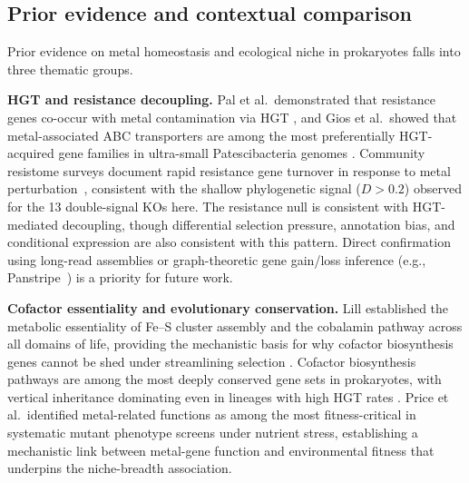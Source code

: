 \documentclass[times]{zHenriquesLab-StyleBioRxiv}
\begin{document}

\subsection{Prior evidence and contextual comparison}

Prior evidence on metal homeostasis and ecological niche in prokaryotes falls into three thematic groups.

\textbf{HGT and resistance decoupling.} Pal et al.\ demonstrated that resistance genes co-occur with metal contamination via HGT \cite{pal2015}, and Gios et al.\ showed that metal-associated ABC transporters are among the most preferentially HGT-acquired gene families in ultra-small Patescibacteria genomes \cite{gios2025}. Community resistome surveys document rapid resistance gene turnover in response to metal perturbation~\cite{hemme2016}, consistent with the shallow phylogenetic signal ($D > 0.2$) observed for the 13 double-signal KOs here. The resistance null is consistent with HGT-mediated decoupling, though differential selection pressure, annotation bias, and conditional expression are also consistent with this pattern. Direct confirmation using long-read assemblies or graph-theoretic gene gain/loss inference (e.g., Panstripe~\cite{tonkinhill2023}) is a priority for future work.

\textbf{Cofactor essentiality and evolutionary conservation.} Lill established the metabolic essentiality of Fe--S cluster assembly and the cobalamin pathway across all domains of life, providing the mechanistic basis for why cofactor biosynthesis genes cannot be shed under streamlining selection \cite{lill2009}. Cofactor biosynthesis pathways are among the most deeply conserved gene sets in prokaryotes, with vertical inheritance dominating even in lineages with high HGT rates \cite{lill2009,braymer2020,mettert2015}. Price et al.\ identified metal-related functions as among the most fitness-critical in systematic mutant phenotype screens under nutrient stress, establishing a mechanistic link between metal-gene function and environmental fitness \cite{price2018} that underpins the niche-breadth association.
\end{document}
